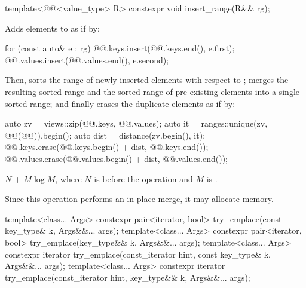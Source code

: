 %
\begin{itemdecl}
template<@@<value_type> R>
  constexpr void insert_range(R&& rg);
\end{itemdecl}

\begin{itemdescr}
\pnum
\effects
Adds elements to  as if by:
\begin{codeblock}
for (const auto& e : rg) {
  @@.keys.insert(@@.keys.end(), e.first);
  @@.values.insert(@@.values.end(), e.second);
}
\end{codeblock}
Then, sorts the range of newly inserted elements
with respect to ;
merges the resulting sorted range and
the sorted range of pre-existing elements into a single sorted range; and
finally erases the duplicate elements as if by:
\begin{codeblock}
auto zv = views::zip(@@.keys, @@.values);
auto it = ranges::unique(zv, @@(@@)).begin();
auto dist = distance(zv.begin(), it);
@@.keys.erase(@@.keys.begin() + dist, @@.keys.end());
@@.values.erase(@@.values.begin() + dist, @@.values.end());
\end{codeblock}

\pnum
\complexity
$N$ + $M \log M$,
where $N$ is  before the operation and
$M$ is .

\pnum
\remarks
Since this operation performs an in-place merge, it may allocate memory.
\end{itemdescr}

%
\begin{itemdecl}
template<class... Args>
  constexpr pair<iterator, bool> try_emplace(const key_type& k, Args&&... args);
template<class... Args>
  constexpr pair<iterator, bool> try_emplace(key_type&& k, Args&&... args);
template<class... Args>
  constexpr iterator try_emplace(const_iterator hint, const key_type& k, Args&&... args);
template<class... Args>
  constexpr iterator try_emplace(const_iterator hint, key_type&& k, Args&&... args);
\end{itemdecl}

